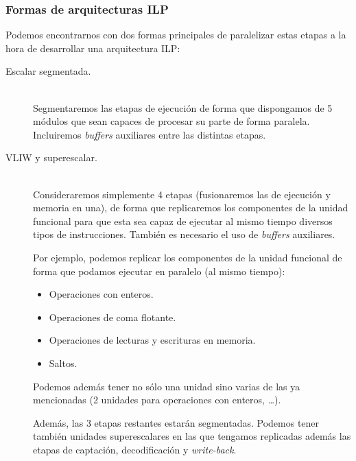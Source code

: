 \subsubsection{Formas de arquitecturas ILP}
Podemos encontrarnos con dos formas principales de paralelizar estas etapas a la hora de desarrollar una arquitectura ILP\@:
\begin{description}
    \item [Escalar segmentada.]~\\ Segmentaremos las etapas de ejecución de forma que dispongamos de 5 módulos que sean capaces de procesar su parte de forma paralela. Incluiremos \emph{buffers} auxiliares entre las distintas etapas.
    \item [VLIW y superescalar.]~\\ Consideraremos simplemente 4 etapas (fusionaremos las de ejecución y memoria en una), de forma que replicaremos los componentes de la unidad funcional para que esta sea capaz de ejecutar al mismo tiempo diversos tipos de instrucciones. También es necesario el uso de \emph{buffers} auxiliares.

        Por ejemplo, podemos replicar los componentes de la unidad funcional de forma que podamos ejecutar en paralelo (al mismo tiempo):
        \begin{itemize}
            \item Operaciones con enteros.
            \item Operaciones de coma flotante.
            \item Operaciones de lecturas y escrituras en memoria.
            \item Saltos.
        \end{itemize}
        Podemos además tener no sólo una unidad sino varias de las ya mencionadas (2 unidades para operaciones con enteros, \ldots).

        Además, las 3 etapas restantes estarán segmentadas. Podemos tener también unidades superescalares en las que tengamos replicadas además las etapas de captación, decodificación y \emph{write-back}.
\end{description}

